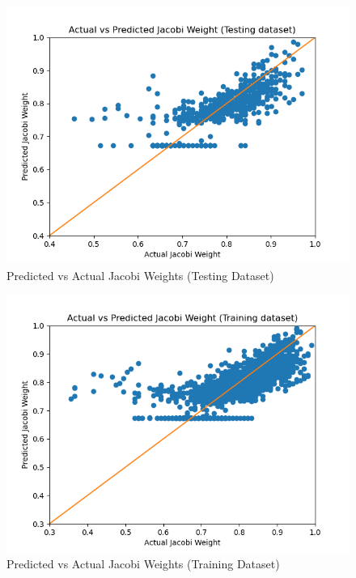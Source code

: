\begin{figure}[h]
  \centering
  \includegraphics[scale=0.7]{figures/10-16-20-jacobi-test-scaled.png}
  \caption{Predicted vs Actual Jacobi Weights (Testing Dataset)}
  \label{fig:test}
\end{figure}

\begin{figure}[h]
  \centering
  \includegraphics[scale=0.7]{figures/10-16-20-jacobi-train-scaled.png}
  \caption{Predicted vs Actual Jacobi Weights (Training Dataset)}
  \label{fig:train}
\end{figure}


